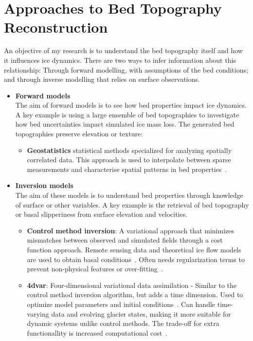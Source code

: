 \section{Approaches to Bed Topography Reconstruction}
An objective of my research is to understand the bed topography itself and how it influences ice dynamics. There are two ways to infer information about this relationship: Through forward modelling, with assumptions of the bed conditions; and through inverse modelling that relies on surface observations.
\begin{itemize}
    \item\textbf{Forward models}\\
    The aim of forward models is to see how bed properties impact ice dynamics. A key example is using a large ensemble of bed topographies to investigate how bed uncertainties impact simulated ice mass loss. The generated bed topographies preserve elevation or texture:    
    \begin{itemize}
            \item\textbf{Geostatistics} statistical methods specialized for analyzing spatially correlated data. This approach is used to interpolate between sparse measurements and characterise spatial patterns in bed properties~\cite{Mackie_2020}.
    \end{itemize}
    \item\textbf{Inversion models}\\
    The aim of these models is to understand bed properties through knowledge of surface or other variables. A key example is the retrieval of bed topography or basal slipperiness from surface elevation and velocities.
        \begin{itemize}
            \item\textbf{Control method inversion}: A variational approach that minimizes mismatches between observed and simulated fields through a cost function approach. Remote sensing data and theoretical ice flow models are used to obtain basal conditions~\cite{deRydt_2013}. Often needs regularization terms to prevent non-physical features or over-fitting~\cite{Morlighem_Goldberg_2024}.
            \item\textbf{4dvar}: Four-dimensional variational data assimilation - Similar to the control method inversion algorithm, but adds a time dimension. Used to optimize model parameters and initial conditions~\cite{Morlighem_Goldberg_2024}. Can handle time-varying data and evolving glacier states, making it more suitable for dynamic systems unlike control methods. The trade-off for extra functionallity is increased computational cost~\cite{Morlighem_Goldberg_2024}.

\end{itemize}
\end{itemize}

